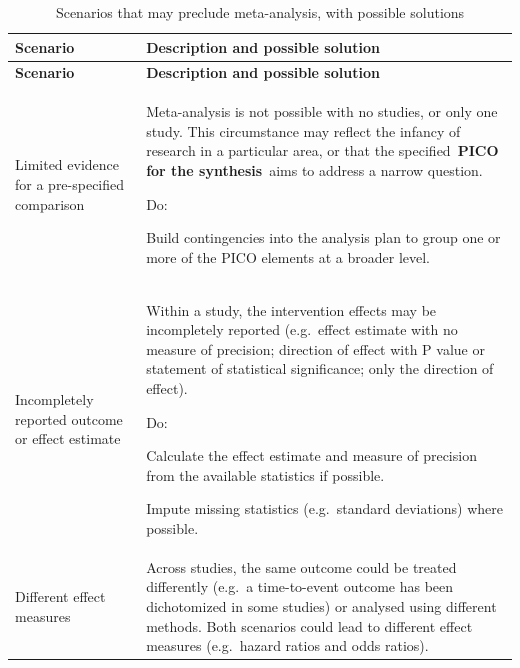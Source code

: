\documentclass[
  11pt,
  a4paper,
  DIV=11,
  numbers=noendperiod]{scrreprt}
\begin{document}
\begin{longtable}[]{@{}
  >{\raggedright\arraybackslash}p{}
  >{\raggedright\arraybackslash}p{}@{}}
\caption{Scenarios that may preclude meta-analysis, with possible
solutions}\label{tbl-no-ma}\tabularnewline
\toprule\noalign{}
\begin{minipage}[b]{\linewidth}\raggedright
\textbf{Scenario}
\end{minipage} & \begin{minipage}[b]{\linewidth}\raggedright
\textbf{Description and possible solution}
\end{minipage} \\
\midrule\noalign{}
\endfirsthead
\toprule\noalign{}
\begin{minipage}[b]{\linewidth}\raggedright
\textbf{Scenario}
\end{minipage} & \begin{minipage}[b]{\linewidth}\raggedright
\textbf{Description and possible solution}
\end{minipage} \\
\midrule\noalign{}
\endhead
\bottomrule\noalign{}
\endlastfoot
Limited evidence for a pre-specified comparison & Meta-analysis is not
possible with no studies, or only one study. This circumstance may
reflect the infancy of research in a particular area, or that the
specified~\textbf{PICO for the synthesis}~aims to address a narrow
question.

Do:

Build contingencies into the analysis plan to group one or more of the
PICO elements at a broader level. \\
Incompletely reported outcome or effect estimate & Within a study, the
intervention effects may be incompletely reported (e.g.~effect estimate
with no measure of precision; direction of effect with P value or
statement of statistical significance; only the direction of effect).

Do:

Calculate the effect estimate and measure of precision from the
available statistics if possible.

Impute missing statistics (e.g.~standard deviations) where possible. \\
Different effect measures & Across studies, the same outcome could be
treated differently (e.g.~a time-to-event outcome has been dichotomized
in some studies) or analysed using different methods. Both scenarios
could lead to different effect measures (e.g.~hazard ratios and odds
ratios).


\end{longtable}
\end{document}
